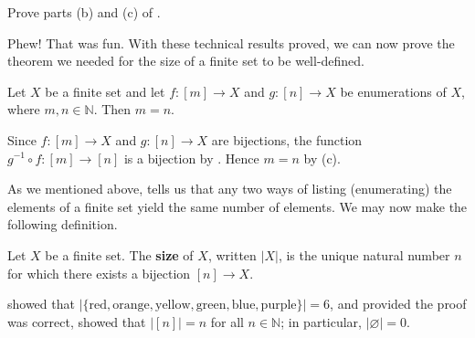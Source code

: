 \begin{exercise}
Prove parts (b) and (c) of .
\end{exercise}

Phew! That was fun. With these technical results proved, we can now prove the theorem we needed for the size of a finite set to be well-defined.

\begin{theorem}
\label{thmUniquenessOfSize}
Let $X$ be a finite set and let $f : [m] \to X$ and $g : [n] \to X$ be enumerations of $X$, where $m,n \in \mathbb{N}$. Then $m=n$.
\end{theorem}

\begin{cproof}
Since $f : [m] \to X$ and $g : [n] \to X$ are bijections, the function $g^{-1} \circ f : [m] \to [n]$ is a bijection by . Hence $m=n$ by (c).
\end{cproof}

As we mentioned above,  tells us that any two ways of listing (enumerating) the elements of a finite set yield the same number of elements. We may now make the following definition.

\begin{definition}
\label{defSize}
Let $X$ be a finite set. The \textbf{size} of $X$, written $|X|$, is the unique natural number $n$ for which there exists a bijection $[n] \to X$.
\end{definition}

\begin{example}
 showed that $|\{ \text{red}, \text{orange}, \text{yellow}, \text{green}, \text{blue}, \text{purple} \}| = 6$, and provided the proof was correct,  showed that $|[n]| = n$ for all $n \in \mathbb{N}$; in particular, $|\varnothing| = 0$.
\end{example}

